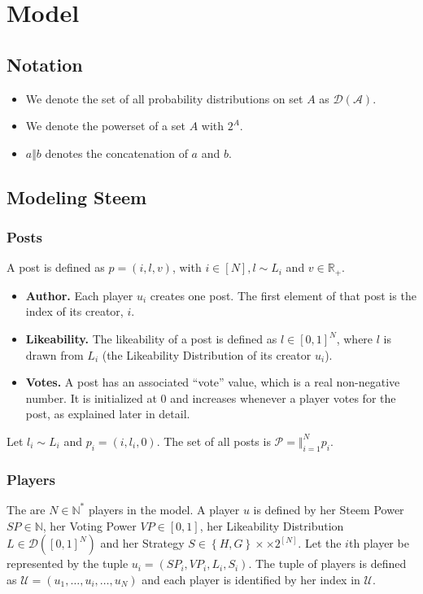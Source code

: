\section{Model}
  \subsection{Notation}
    \begin{itemize}
      \item We denote the set of all probability distributions on set $A$ as
      $\mathcal{D\left(A\right)}$.
      \item We denote the powerset of a set $A$ with $2^A$.
      \item $a \Vert b$ denotes the concatenation of $a$ and $b$.
    \end{itemize}

  \subsection{Modeling Steem}
    \subsubsection*{Posts}
      A post is defined as $p = \left(i, l, v\right)$, with $i \in
      \left[N\right], l \sim L_i$ and $v \in \mathbb{R}_{+}$.
      \begin{itemize}
        \item \textbf{Author.} Each player $u_i$ creates one post. The first
        element of that post is the index of its creator, $i$.

        \item \textbf{Likeability.} The likeability of a post is defined as $l
        \in \left[0, 1\right]^N$, where $l$ is drawn from $L_i$ (the Likeability
        Distribution of its creator $u_i$).

        \item \textbf{Votes.} A post has an associated ``vote'' value, which is a
        real non-negative number. It is initialized at 0 and increases whenever a
        player votes for the post, as explained later in detail.
      \end{itemize}
      Let $l_i \sim L_i$ and $p_i = \left(i, l_i, 0\right)$. The set of all posts
      is $\mathcal{P} = \Vert_{i=1}^N p_i$.

    \subsubsection*{Players}
      The are $N \in \mathbb{N}^{*}$ players in the model. A player $u$ is
      defined by her Steem Power $SP \in \mathbb{N}$, her Voting Power $VP \in
      \left[0, 1\right]$, her Likeability Distribution $L \in \mathcal{D}
      \left(\left[0, 1\right]^N\right)$ and her Strategy $S \in \left\{H,
      G\right\} \times \times 2^{\left[N\right]}$. Let the $i$th player be
      represented by the tuple $u_i = \left(SP_i, VP_i, L_i, S_i\right)$. The
      tuple of players is defined as $\mathcal{U} = \left(u_1, \dots, u_i,
      \dots, u_N\right)$ and each player is identified by her index in
      $\mathcal{U}$.

